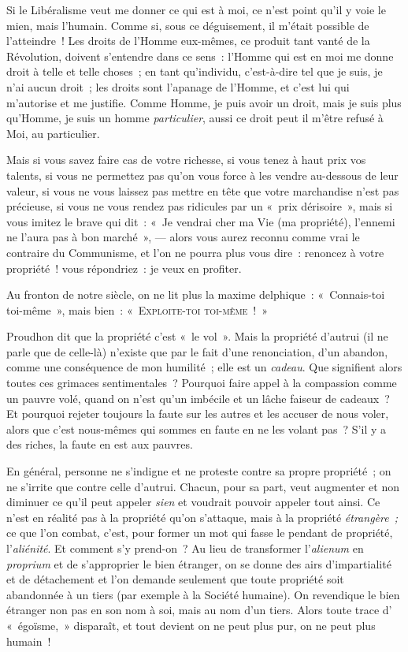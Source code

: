 \documentclass[french,twoside]{book} %
\begin{document}
Si le Libéralisme veut me donner ce qui est à moi, ce n’est point qu’il y voie le mien, mais l’humain. Comme si, sous ce déguisement, il m’était possible de l’atteindre ! Les droits de l’Homme eux-mêmes, ce produit tant vanté de la Révolution, doivent s’entendre dans ce sens : l’Homme qui est en moi me donne droit à telle et telle choses ; en tant qu’individu,  c’est-à-dire tel que je suis, je n’ai aucun droit ; les droits sont l’apanage de l’Homme, et c’est lui qui m’autorise et me justifie. Comme Homme, je puis avoir un droit, mais je suis plus qu’Homme, je suis un homme \emph{particulier}, aussi ce droit peut il m’être refusé à Moi, au particulier.\par
Mais si vous savez faire cas de votre richesse, si vous tenez à haut prix vos talents, si vous ne permettez pas qu’on vous force à les vendre au-dessous de leur valeur, si vous ne vous laissez pas mettre en tête que votre marchandise n’est pas précieuse, si vous ne vous rendez pas ridicules par un « prix dérisoire », mais si vous imitez le brave qui dit : « Je vendrai cher ma Vie (ma propriété), l’ennemi ne l’aura pas à bon marché », — alors vous aurez reconnu comme vrai le contraire du Communisme, et l’on ne pourra plus vous dire : renoncez à votre propriété ! vous répondriez : je veux en profiter.\par
Au fronton de notre siècle, on ne lit plus la maxime delphique : « Connais-toi toi-même », mais bien : « E{\scshape xploite-toi toi-même} ! »\par
Proudhon dit que la propriété c’est « le vol ». Mais la propriété d’autrui (il ne parle que de celle-là) n’existe que par le fait d’une renonciation, d’un abandon, comme une conséquence de mon humilité ; elle est un \emph{cadeau}. Que signifient alors toutes ces grimaces sentimentales ? Pourquoi faire appel à la compassion comme un pauvre volé, quand on n’est qu’un imbécile et un lâche faiseur de cadeaux ? Et pourquoi rejeter toujours la faute sur les autres et les accuser de nous voler, alors que c’est nous-mêmes qui sommes en faute en ne les volant pas ? S’il y a des riches, la faute en est aux pauvres.\par
En général, personne ne s’indigne et ne proteste contre sa propre propriété ; on ne s’irrite que contre celle d’autrui. Chacun, pour sa part, veut augmenter et non diminuer ce qu’il peut appeler \emph{sien} et voudrait pouvoir appeler tout ainsi. Ce n’est en réalité  pas à la propriété qu’on s’attaque, mais à la propriété \emph{étrangère ;} ce que l’on combat, c’est, pour former un mot qui fasse le pendant de propriété, l’\emph{aliénité}. Et comment s’y prend-on ? Au lieu de transformer l’\emph{alienum} en \emph{proprium} et de s’approprier le bien étranger, on se donne des airs d’impartialité et de détachement et l’on demande seulement que toute propriété soit abandonnée à un tiers (par exemple à la Société humaine). On revendique le bien étranger non pas en son nom à soi, mais au nom d’un tiers. Alors toute trace d’ « égoïsme, » disparaît, et tout devient on ne peut plus pur, on ne peut plus humain !\par
\end{document}
